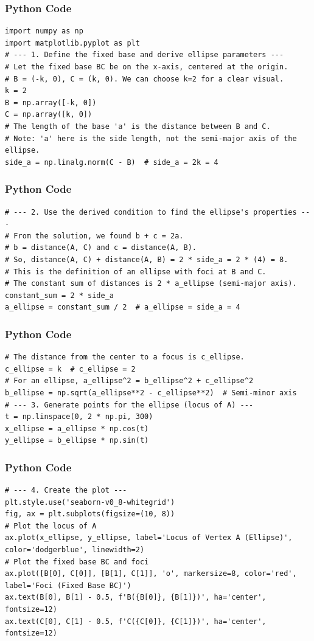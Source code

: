 \documentclass{beamer}
\begin{document}
\begin{frame}[fragile]
    \frametitle{Python Code}
    \begin{lstlisting}
import numpy as np
import matplotlib.pyplot as plt
# --- 1. Define the fixed base and derive ellipse parameters ---
# Let the fixed base BC be on the x-axis, centered at the origin.
# B = (-k, 0), C = (k, 0). We can choose k=2 for a clear visual.
k = 2
B = np.array([-k, 0])
C = np.array([k, 0])
# The length of the base 'a' is the distance between B and C.
# Note: 'a' here is the side length, not the semi-major axis of the ellipse.
side_a = np.linalg.norm(C - B)  # side_a = 2k = 4
\end{lstlisting}
\end{frame}

\begin{frame}[fragile]
\frametitle{Python Code}
\begin{lstlisting}
# --- 2. Use the derived condition to find the ellipse's properties ---
# From the solution, we found b + c = 2a.
# b = distance(A, C) and c = distance(A, B).
# So, distance(A, C) + distance(A, B) = 2 * side_a = 2 * (4) = 8.
# This is the definition of an ellipse with foci at B and C.
# The constant sum of distances is 2 * a_ellipse (semi-major axis).
constant_sum = 2 * side_a
a_ellipse = constant_sum / 2  # a_ellipse = side_a = 4
\end{lstlisting}
\end{frame}

\begin{frame}[fragile]
\frametitle{Python Code}
\begin{lstlisting}
# The distance from the center to a focus is c_ellipse.
c_ellipse = k  # c_ellipse = 2
# For an ellipse, a_ellipse^2 = b_ellipse^2 + c_ellipse^2
b_ellipse = np.sqrt(a_ellipse**2 - c_ellipse**2)  # Semi-minor axis
# --- 3. Generate points for the ellipse (locus of A) ---
t = np.linspace(0, 2 * np.pi, 300)
x_ellipse = a_ellipse * np.cos(t)
y_ellipse = b_ellipse * np.sin(t)
\end{lstlisting}
\end{frame}

\begin{frame}[fragile]
\frametitle{Python Code}
\begin{lstlisting}
# --- 4. Create the plot ---
plt.style.use('seaborn-v0_8-whitegrid')
fig, ax = plt.subplots(figsize=(10, 8))
# Plot the locus of A
ax.plot(x_ellipse, y_ellipse, label='Locus of Vertex A (Ellipse)', color='dodgerblue', linewidth=2)
# Plot the fixed base BC and foci
ax.plot([B[0], C[0]], [B[1], C[1]], 'o', markersize=8, color='red', label='Foci (Fixed Base BC)')
ax.text(B[0], B[1] - 0.5, f'B({B[0]}, {B[1]})', ha='center', fontsize=12)
ax.text(C[0], C[1] - 0.5, f'C({C[0]}, {C[1]})', ha='center', fontsize=12)
\end{lstlisting}
\end{frame}
\end{document}
